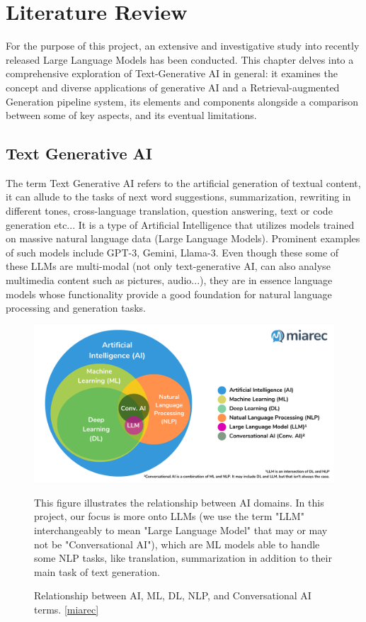 \chapter{Literature Review}
For the purpose of this project, an extensive and investigative study into recently released Large Language Models has been conducted. This chapter delves into a comprehensive exploration of Text-Generative AI in general: it examines the concept and diverse applications of generative AI and a Retrieval-augmented Generation pipeline system, its elements and components alongside a comparison between some of key aspects, and its eventual limitations.
\newpage

\section{Text Generative AI}
The term Text Generative AI refers to the artificial generation of textual content, it can allude to the tasks of next word suggestions, summarization, rewriting in different tones, cross-language translation, question answering, text or code generation etc...
It is a type of Artificial Intelligence that utilizes models trained on massive natural language data (Large Language Models). Prominent examples of such models include GPT-3, Gemini, Llama-3. Even though these some of these LLMs are multi-modal (not only text-generative AI, can also analyse multimedia content such as pictures, audio...), they are in essence language models whose functionality provide a good foundation for natural language processing and generation tasks.
\begin{figure}[htbp]
    \centering
    \includegraphics[width=.97\linewidth]{./figures/genai-relation-diagram.png}
    \caption{Relationship between AI, ML, DL, NLP, and Conversational AI terms. \href{https://blog.miarec.com/contact-centers-ai-definition}{[miarec]}}
    \begin{flushleft}
        \small This figure illustrates the relationship between AI domains. In this project, our focus is more onto LLMs (we use the term "LLM" interchangeably to mean "Large Language Model" that may or may not be "Conversational AI"), which are ML models able to handle some NLP tasks, like translation, summarization in addition to their main task of text generation.
    \end{flushleft}
\end{figure}\newline
